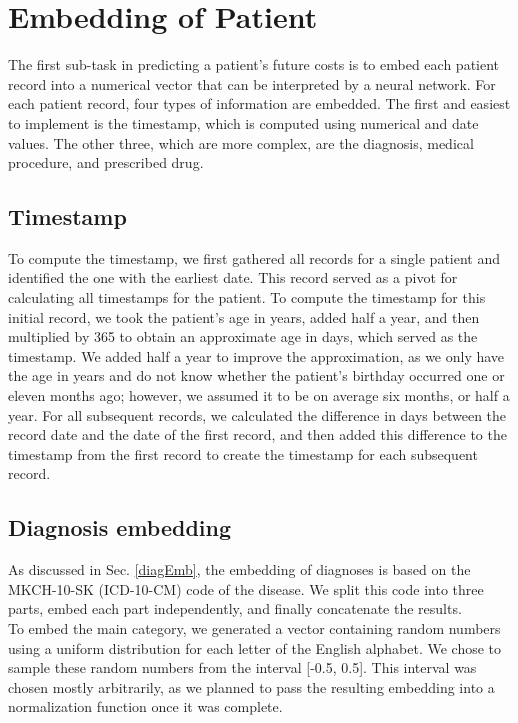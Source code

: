 
\section{Embedding of Patient}
\label{embeddingImple}

The first sub-task in predicting a patient’s future costs is to embed each patient record into a numerical vector that can be interpreted by a neural network. For each patient record, four types of information are embedded. The first and easiest to implement is the timestamp, which is computed using numerical and date values. The other three, which are more complex, are the diagnosis, medical procedure, and prescribed drug.

\subsection{Timestamp}
\label{timespampImple}

To compute the timestamp, we first gathered all records for a single patient and identified the one with the earliest date. This record served as a pivot for calculating all timestamps for the patient. To compute the timestamp for this initial record, we took the patient's age in years, added half a year, and then multiplied by 365 to obtain an approximate age in days, which served as the timestamp. We added half a year to improve the approximation, as we only have the age in years and do not know whether the patient's birthday occurred one or eleven months ago; however, we assumed it to be on average six months, or half a year. For all subsequent records, we calculated the difference in days between the record date and the date of the first record, and then added this difference to the timestamp from the first record to create the timestamp for each subsequent record.

\subsection{Diagnosis embedding}

As discussed in Sec. \ref{diagEmb}, the embedding of diagnoses is based on the MKCH-10-SK (ICD-10-CM) code of the disease. We split this code into three parts, embed each part independently, and finally concatenate the results.
\\

To embed the main category, we generated a vector containing random numbers using a uniform distribution for each letter of the English alphabet. We chose to sample these random numbers from the interval [-0.5, 0.5]. This interval was chosen mostly arbitrarily, as we planned to pass the resulting embedding into a normalization function once it was complete.
\\


